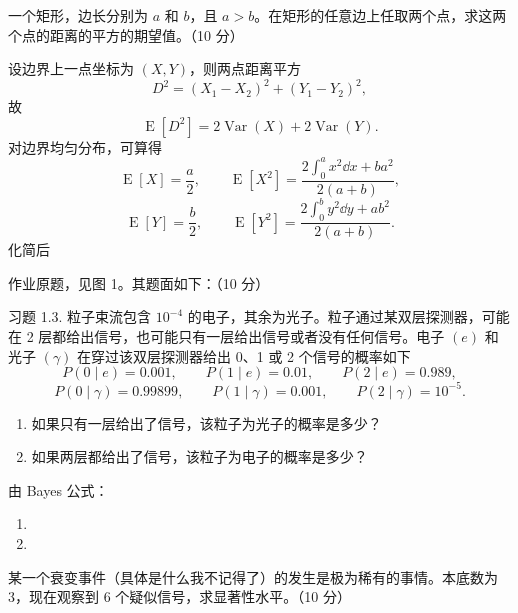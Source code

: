 \begin{question}
一个矩形，边长分别为 $a$ 和 $b$，且 $a>b$。在矩形的任意边上任取两个点，求这两个点的距离的平方的期望值。（10 分）
\begin{solution}
设边界上一点坐标为 $(X,Y)$，则两点距离平方
\[
D^2=(X_1-X_2)^2+(Y_1-Y_2)^2,
\]
故
\[
\operatorname{E}[D^2]=2\operatorname{Var}(X)+2\operatorname{Var}(Y).
\]
对边界均匀分布，可算得
\[
\operatorname{E}[X]=\frac a2,
\qquad
\operatorname{E}[X^2]=\frac{2\int_0^a x^2\dd{x}+ba^2}{2(a+b)},
\]
\[
\operatorname{E}[Y]=\frac b2,
\qquad
\operatorname{E}[Y^2]=\frac{2\int_0^b y^2\dd{y}+ab^2}{2(a+b)}.
\]
化简后
\end{solution}
\end{question}

\begin{question}
作业原题，见图 1。其题面如下：（10 分）

习题 1.3.
粒子束流包含 $10^{-4}$ 的电子，其余为光子。粒子通过某双层探测器，可能在 2 层都给出信号，也可能只有一层给出信号或者没有任何信号。电子 $(e)$ 和光子 $(\gamma)$ 在穿过该双层探测器给出 0、1 或 2 个信号的概率如下
\[
P(0\mid e)=0.001,\qquad P(1\mid e)=0.01,\qquad P(2\mid e)=0.989,
\]
\[
P(0\mid \gamma)=0.99899,\qquad P(1\mid \gamma)=0.001,\qquad P(2\mid \gamma)=10^{-5}.
\]
\begin{enumerate}[label=(\alph*),leftmargin=2.8em,itemsep=0.2em]
\item 如果只有一层给出了信号，该粒子为光子的概率是多少？
\item 如果两层都给出了信号，该粒子为电子的概率是多少？
\end{enumerate}
\begin{solution}
由 Bayes 公式：
\begin{enumerate}[label=(\arabic*),leftmargin=2.8em,itemsep=0.2em]
\item
{}
\item
{}
\end{enumerate}
\end{solution}
\end{question}

\begin{question}
某一个衰变事件（具体是什么我不记得了）的发生是极为稀有的事情。本底数为 3，现在观察到 6 个疑似信号，求显著性水平。（10 分）
\begin{solution}
\end{solution}
\end{question}


